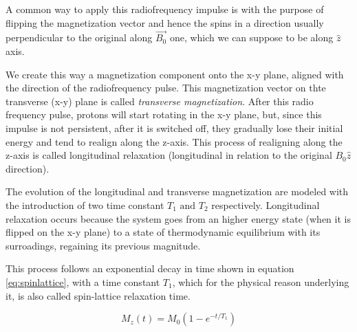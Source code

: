 \documentclass[11pt]{report}
\begin{document}
A common way to apply this radiofrequency impulse is with the purpose of flipping the magnetization vector and hence the spins in a direction usually perpendicular to the original along $\overrightarrow{B_0}$ one, which we can suppose to be along $\hat z$ axis.

We create this way a magnetization component onto the x-y plane, aligned with the direction of the radiofrequency pulse.
This magnetization vector on thte transverse (x-y) plane is called \emph{transverse magnetization}.
After this radio frequency pulse, protons will start rotating in the x-y plane, but, since this impulse is not persistent, after it is switched off, they gradually lose their initial energy and tend to realign along the z-axis.
This process of realigning along the z-axis is called longitudinal relaxation (longitudinal in relation to the original $B_0 \hat z$ direction).

The evolution of the longitudinal and transverse magnetization are modeled with the introduction of two time constant $T_1 \text{ and } T_2$ respectively.
Longitudinal relaxation occurs because the system goes from an higher energy state (when it is flipped on the x-y plane) to a state of thermodynamic equilibrium with its surroadings, regaining its previous magnitude.

This process follows an exponential decay in time shown in equation \ref{eq:spinlattice}, with a time constant $T_1$, which for the physical reason underlying it, is also called spin-lattice relaxation time.

\begin{equation}\label{eq:spinlattice}
M_z(t) = M_0 (1-e^{-t/T_1})
\end{equation}
\end{document}
